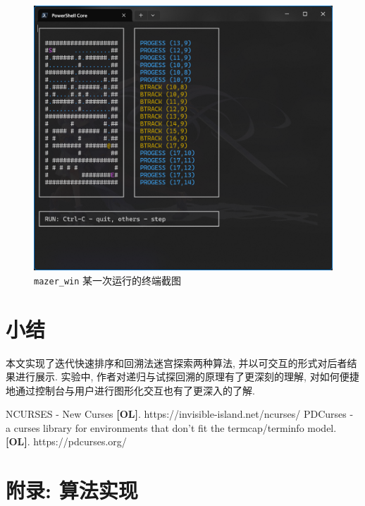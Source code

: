 \documentclass[12pt]{article}
\begin{document}
\begin{figure}[H]
    \centering
    \includegraphics[scale=0.4]{screenshot_mazerwin_v010}
    \caption{\texttt{mazer\_win} 某一次运行的终端截图}
    \label{fig_screenshot_mazerwin}
\end{figure}

\section{小结}

本文实现了迭代快速排序和回溯法迷宫探索两种算法, 并以可交互的形式对后者结果进行展示.  实验中, 作者对递归与试探回溯的原理有了更深刻的理解, 对如何便捷地通过控制台与用户进行图形化交互也有了更深入的了解.

\begin{thebibliography}{}

 NCURSES - New Curses \textbf{[OL]}. https://invisible-island.net/ncurses/
 PDCurses - a curses library for environments that don't fit the termcap/terminfo model. \textbf{[OL]}. https://pdcurses.org/

\end{thebibliography}

\appendix

\section{附录: 算法实现}
\end{document}

